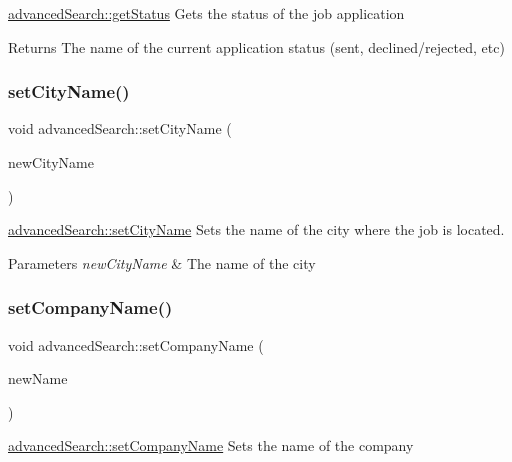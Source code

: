 \mbox{\hyperlink{classadvanced_search_afc318495c6475695844bd0f22c6c1e3c}{advanced\+Search\+::get\+Status}} Gets the status of the job application 

\begin{DoxyReturn}{Returns}
The name of the current application status (sent, declined/rejected, etc) 
\end{DoxyReturn}
\mbox{\label{classadvanced_search_a285bcf54a61d42fa81a7d1a5a86c5779}} 
\subsubsection{\texorpdfstring{setCityName()}{setCityName()}}
{\footnotesize\ttfamily void advanced\+Search\+::set\+City\+Name (\begin{DoxyParamCaption}\item[{Q\+String}]{new\+City\+Name }\end{DoxyParamCaption})}



\mbox{\hyperlink{classadvanced_search_a285bcf54a61d42fa81a7d1a5a86c5779}{advanced\+Search\+::set\+City\+Name}} Sets the name of the city where the job is located. 


\begin{DoxyParams}{Parameters}
{\em new\+City\+Name} & The name of the city \\
\hline
\end{DoxyParams}
\mbox{\label{classadvanced_search_a6d817d740d8e614bf93cec866735bd7f}} 
\subsubsection{\texorpdfstring{setCompanyName()}{setCompanyName()}}
{\footnotesize\ttfamily void advanced\+Search\+::set\+Company\+Name (\begin{DoxyParamCaption}\item[{Q\+String}]{new\+Name }\end{DoxyParamCaption})}



\mbox{\hyperlink{classadvanced_search_a6d817d740d8e614bf93cec866735bd7f}{advanced\+Search\+::set\+Company\+Name}} Sets the name of the company 



